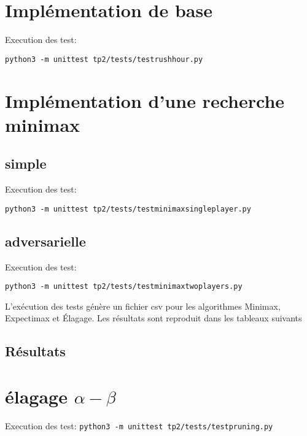 \documentclass{article}
\begin{document}
    

    \section{Implémentation de base}

    Execution des test:

    \texttt{python3 -m unittest tp2/tests/testrushhour.py}

    \section{Implémentation d'une recherche minimax}

    \subsection{simple}

    Execution des test:

    \texttt{python3 -m unittest tp2/tests/testminimaxsingleplayer.py}

    \subsection{adversarielle}

    Execution des test:

    \texttt{python3 -m unittest tp2/tests/testminimaxtwoplayers.py}

    \vspace{0.5cm}

    L'exécution des tests génère un fichier csv pour les algorithmes Minimax, Expectimax et Élagage.
    Les résultats sont reproduit dans les tableaux suivants

    \subsection{Résultats}

    

    \section{élagage $\alpha-\beta$}

    Execution des test:
    \texttt{python3 -m unittest tp2/tests/testpruning.py}

    

    \clearpage
\end{document}
